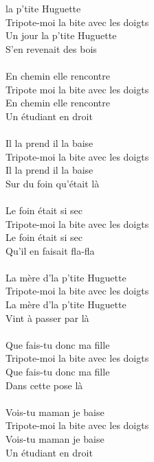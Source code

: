 
 la p'tite Huguette
\\Tripote-moi la bite avec les doigts
\\Un jour la p'tite Huguette
\\S'en revenait des bois ~~~~~~~~~~~~~~~~~~\bissimple
\\\\En chemin elle rencontre
\\Tripote moi la bite avec les doigts
\\En chemin elle rencontre
\\Un étudiant en droit ~~~~~~~~~~~~~~~~~~\bissimple
\\\\Il la prend il la baise
\\Tripote-moi la bite avec les doigts
\\Il la prend il la baise
\\Sur du foin qu'était là ~~~~~~~~~~~~~~~~\bissimple
\\\\Le foin était si sec
\\Tripote-moi la bite avec les doigts
\\Le foin était si sec
\\Qu'il en faisait fla-fla ~~~~~~~~~~~~~~~~~\bissimple
\\\\La mère d'la p'tite Huguette
\\Tripote-moi la bite avec les doigts
\\La mère d'la p'tite Huguette
\\Vint à passer par là ~~~~~~~~~~~~~~~~~~~\bissimple
\\\\Que fais-tu donc ma fille
\\Tripote-moi la bite avec les doigts
\\Que fais-tu donc ma fille
\\Dans cette pose là ~~~~~~~~~~~~~~~~~~~~~\bissimple
\\\\Vois-tu maman je baise
\\Tripote-moi la bite avec les doigts
\\Vois-tu maman je baise
\\Un étudiant en droit ~~~~~~~~~~~~~~~~~~\bissimple
